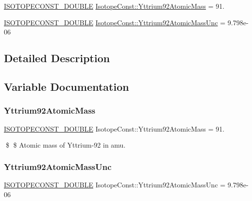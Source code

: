 \begin{DoxyCompactItemize}
\item 
\mbox{\hyperlink{group___isotope_const-_macros_ga8f45a7272ce02c0b4c65c44636ed719a}{I\+S\+O\+T\+O\+P\+E\+C\+O\+N\+S\+T\+\_\+\+D\+O\+U\+B\+LE}} \mbox{\hyperlink{group___isotope_const-_yttrium-_y92_ga50538e8bb5f6752f675abffc9f772824}{Isotope\+Const\+::\+Yttrium92\+Atomic\+Mass}} = 91.
\item 
\mbox{\hyperlink{group___isotope_const-_macros_ga8f45a7272ce02c0b4c65c44636ed719a}{I\+S\+O\+T\+O\+P\+E\+C\+O\+N\+S\+T\+\_\+\+D\+O\+U\+B\+LE}} \mbox{\hyperlink{group___isotope_const-_yttrium-_y92_ga1e02111b87626eaf486e0920e0c0013c}{Isotope\+Const\+::\+Yttrium92\+Atomic\+Mass\+Unc}} = 9.\+798e-\/06
\end{DoxyCompactItemize}


\subsection{Detailed Description}


\subsection{Variable Documentation}
\mbox{\label{group___isotope_const-_yttrium-_y92_ga50538e8bb5f6752f675abffc9f772824}} 
\subsubsection{\texorpdfstring{Yttrium92\+Atomic\+Mass}{Yttrium92AtomicMass}}
{\footnotesize\ttfamily \mbox{\hyperlink{group___isotope_const-_macros_ga8f45a7272ce02c0b4c65c44636ed719a}{I\+S\+O\+T\+O\+P\+E\+C\+O\+N\+S\+T\+\_\+\+D\+O\+U\+B\+LE}} Isotope\+Const\+::\+Yttrium92\+Atomic\+Mass = 91.}

\$ \$ Atomic mass of Yttrium-\/92 in amu. \mbox{\label{group___isotope_const-_yttrium-_y92_ga1e02111b87626eaf486e0920e0c0013c}} 
\subsubsection{\texorpdfstring{Yttrium92\+Atomic\+Mass\+Unc}{Yttrium92AtomicMassUnc}}
{\footnotesize\ttfamily \mbox{\hyperlink{group___isotope_const-_macros_ga8f45a7272ce02c0b4c65c44636ed719a}{I\+S\+O\+T\+O\+P\+E\+C\+O\+N\+S\+T\+\_\+\+D\+O\+U\+B\+LE}} Isotope\+Const\+::\+Yttrium92\+Atomic\+Mass\+Unc = 9.\+798e-\/06}

